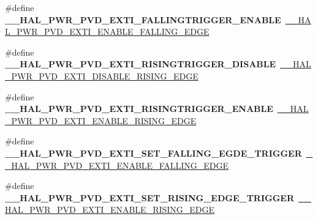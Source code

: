 \begin{DoxyCompactItemize}
\item 
\#define {\bfseries \+\_\+\+\_\+\+H\+A\+L\+\_\+\+P\+W\+R\+\_\+\+P\+V\+D\+\_\+\+E\+X\+T\+I\+\_\+\+F\+A\+L\+L\+I\+N\+G\+T\+R\+I\+G\+G\+E\+R\+\_\+\+E\+N\+A\+B\+LE}~\hyperlink{group___p_w_r___exported___macro_ga5b971478563a00e1ee1a9d8ca8054e08}{\+\_\+\+\_\+\+H\+A\+L\+\_\+\+P\+W\+R\+\_\+\+P\+V\+D\+\_\+\+E\+X\+T\+I\+\_\+\+E\+N\+A\+B\+L\+E\+\_\+\+F\+A\+L\+L\+I\+N\+G\+\_\+\+E\+D\+GE}\hypertarget{group___h_a_l___p_w_r___aliased___macros_ga03036e3fb46ad3933576789d7d7290e5}{}\label{group___h_a_l___p_w_r___aliased___macros_ga03036e3fb46ad3933576789d7d7290e5}

\item 
\#define {\bfseries \+\_\+\+\_\+\+H\+A\+L\+\_\+\+P\+W\+R\+\_\+\+P\+V\+D\+\_\+\+E\+X\+T\+I\+\_\+\+R\+I\+S\+I\+N\+G\+T\+R\+I\+G\+G\+E\+R\+\_\+\+D\+I\+S\+A\+B\+LE}~\hyperlink{group___p_w_r___exported___macro_ga1ca8fd7f3286a176f6be540c75a004c6}{\+\_\+\+\_\+\+H\+A\+L\+\_\+\+P\+W\+R\+\_\+\+P\+V\+D\+\_\+\+E\+X\+T\+I\+\_\+\+D\+I\+S\+A\+B\+L\+E\+\_\+\+R\+I\+S\+I\+N\+G\+\_\+\+E\+D\+GE}\hypertarget{group___h_a_l___p_w_r___aliased___macros_gadc23ac66f1b8c429fe2bf6727220cfea}{}\label{group___h_a_l___p_w_r___aliased___macros_gadc23ac66f1b8c429fe2bf6727220cfea}

\item 
\#define {\bfseries \+\_\+\+\_\+\+H\+A\+L\+\_\+\+P\+W\+R\+\_\+\+P\+V\+D\+\_\+\+E\+X\+T\+I\+\_\+\+R\+I\+S\+I\+N\+G\+T\+R\+I\+G\+G\+E\+R\+\_\+\+E\+N\+A\+B\+LE}~\hyperlink{group___p_w_r___exported___macro_ga7bef3f30c9fe267c99d5240fbf3f878c}{\+\_\+\+\_\+\+H\+A\+L\+\_\+\+P\+W\+R\+\_\+\+P\+V\+D\+\_\+\+E\+X\+T\+I\+\_\+\+E\+N\+A\+B\+L\+E\+\_\+\+R\+I\+S\+I\+N\+G\+\_\+\+E\+D\+GE}\hypertarget{group___h_a_l___p_w_r___aliased___macros_ga90e56e3a788760b51a22ffbbf52bb977}{}\label{group___h_a_l___p_w_r___aliased___macros_ga90e56e3a788760b51a22ffbbf52bb977}

\item 
\#define {\bfseries \+\_\+\+\_\+\+H\+A\+L\+\_\+\+P\+W\+R\+\_\+\+P\+V\+D\+\_\+\+E\+X\+T\+I\+\_\+\+S\+E\+T\+\_\+\+F\+A\+L\+L\+I\+N\+G\+\_\+\+E\+G\+D\+E\+\_\+\+T\+R\+I\+G\+G\+ER}~\hyperlink{group___p_w_r___exported___macro_ga5b971478563a00e1ee1a9d8ca8054e08}{\+\_\+\+\_\+\+H\+A\+L\+\_\+\+P\+W\+R\+\_\+\+P\+V\+D\+\_\+\+E\+X\+T\+I\+\_\+\+E\+N\+A\+B\+L\+E\+\_\+\+F\+A\+L\+L\+I\+N\+G\+\_\+\+E\+D\+GE}\hypertarget{group___h_a_l___p_w_r___aliased___macros_ga14336c482ff10c368ab9b7bbf1873894}{}\label{group___h_a_l___p_w_r___aliased___macros_ga14336c482ff10c368ab9b7bbf1873894}

\item 
\#define {\bfseries \+\_\+\+\_\+\+H\+A\+L\+\_\+\+P\+W\+R\+\_\+\+P\+V\+D\+\_\+\+E\+X\+T\+I\+\_\+\+S\+E\+T\+\_\+\+R\+I\+S\+I\+N\+G\+\_\+\+E\+D\+G\+E\+\_\+\+T\+R\+I\+G\+G\+ER}~\hyperlink{group___p_w_r___exported___macro_ga7bef3f30c9fe267c99d5240fbf3f878c}{\+\_\+\+\_\+\+H\+A\+L\+\_\+\+P\+W\+R\+\_\+\+P\+V\+D\+\_\+\+E\+X\+T\+I\+\_\+\+E\+N\+A\+B\+L\+E\+\_\+\+R\+I\+S\+I\+N\+G\+\_\+\+E\+D\+GE}\hypertarget{group___h_a_l___p_w_r___aliased___macros_ga2f1057dd8cf95ab4a33a3dbe5314a5a2}{}\label{group___h_a_l___p_w_r___aliased___macros_ga2f1057dd8cf95ab4a33a3dbe5314a5a2}


\end{DoxyCompactItemize}
